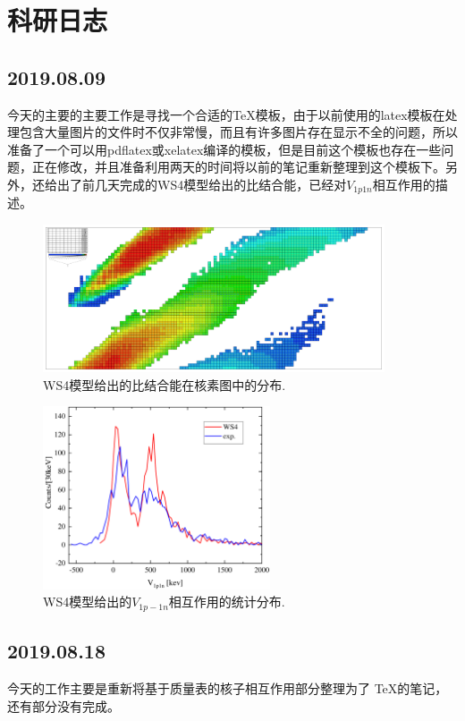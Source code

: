 \chapter{科研日志}
\section{2019.08.09}
今天的主要的主要工作是寻找一个合适的\TeX 模板，由于以前使用的latex模板在处理包含大量图片的文件时不仅非常慢，而且有许多图片存在显示不全的问题，所以准备了一个可以用pdflatex或xelatex编译的模板，但是目前这个模板也存在一些问题，正在修改，并且准备利用两天的时间将以前的笔记重新整理到这个模板下。另外，还给出了前几天完成的WS4模型给出的比结合能，已经对$V_{1p1n}$相互作用的描述。
\begin{figure}[H]
\centering
\includegraphics[width=0.9\textwidth]{figure/WS4perA.pdf}
\caption{WS4模型给出的比结合能在核素图中的分布.\label{fig_WS4perA}}
\end{figure}
\begin{figure}[H]
\centering
\includegraphics[width=0.6\textwidth]{figure/WS4V1p1n.pdf}
\caption{WS4模型给出的$V_{1p-1n}$相互作用的统计分布.\label{fig_WS4V1p1n}}
\end{figure}
\section{2019.08.18}
今天的工作主要是重新将基于质量表的核子相互作用部分整理为了 \TeX 的笔记，还有部分没有完成。
